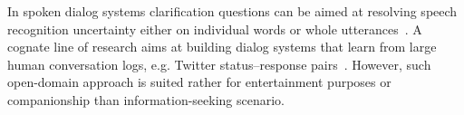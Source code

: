In spoken dialog systems clarification questions can be aimed at resolving speech recognition uncertainty either on individual words or whole utterances~\cite{stoyanchev2013}.
A cognate line of research aims at building dialog systems that learn from large human conversation logs, e.g. Twitter status--response pairs~\cite{ritter2011}.
However, such open-domain approach is suited rather for entertainment purposes or companionship than information-seeking scenario.










\clearpage